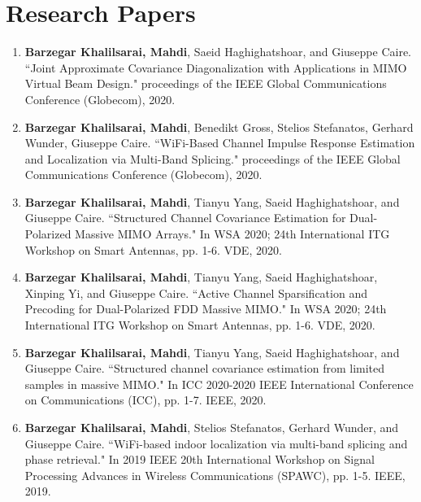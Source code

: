 \documentclass[a4paper,10pt]{article}
\begin{document}
\section{Research Papers}
\begin{enumerate}
	\subsection*{Published}
	
	\item \textbf{Barzegar Khalilsarai, Mahdi}, Saeid Haghighatshoar, and Giuseppe Caire. ``Joint Approximate Covariance Diagonalization with Applications in MIMO Virtual Beam Design." proceedings of the IEEE Global Communications Conference (Globecom), 2020.
	
	\item \textbf{Barzegar Khalilsarai, Mahdi}, Benedikt Gross, Stelios Stefanatos, Gerhard Wunder, Giuseppe Caire. ``WiFi-Based Channel Impulse Response Estimation and Localization via Multi-Band Splicing." proceedings of the IEEE Global Communications Conference (Globecom), 2020.
	
	\item \textbf{Barzegar Khalilsarai, Mahdi}, Tianyu Yang, Saeid Haghighatshoar, and Giuseppe Caire. ``Structured Channel Covariance Estimation for Dual-Polarized Massive MIMO Arrays." In WSA 2020; 24th International ITG Workshop on Smart Antennas, pp. 1-6. VDE, 2020.
	
	\item \textbf{Barzegar Khalilsarai, Mahdi}, Tianyu Yang, Saeid Haghighatshoar, Xinping Yi, and Giuseppe Caire. ``Active Channel Sparsification and Precoding for Dual-Polarized FDD Massive MIMO." In WSA 2020; 24th International ITG Workshop on Smart Antennas, pp. 1-6. VDE, 2020.
	
	\item \textbf{Barzegar Khalilsarai, Mahdi}, Tianyu Yang, Saeid Haghighatshoar, and Giuseppe Caire. ``Structured channel covariance estimation from limited samples in massive MIMO." In ICC 2020-2020 IEEE International Conference on Communications (ICC), pp. 1-7. IEEE, 2020.
	
	\item \textbf{Barzegar Khalilsarai, Mahdi}, Stelios Stefanatos, Gerhard Wunder, and Giuseppe Caire. ``WiFi-based indoor localization via multi-band splicing and phase retrieval." In 2019 IEEE 20th International Workshop on Signal Processing Advances in Wireless Communications (SPAWC), pp. 1-5. IEEE, 2019.
	

\end{enumerate}
\end{document}
